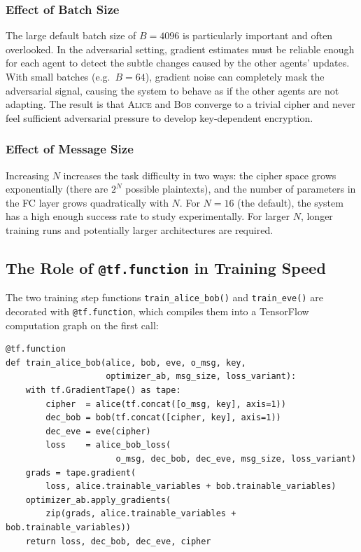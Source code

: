 \documentclass[12pt, a4paper]{article}
\newcommand{\alice}{\textsc{Alice}}
\newcommand{\bob}{\textsc{Bob}}
\newcommand{\code}[1]{\texttt{\color{CodeRed}#1}}
\begin{document}
\subsubsection*{Effect of Batch Size}

The large default batch size of $B=4096$ is particularly important
and often overlooked. In the adversarial setting, gradient estimates
must be reliable enough for each agent to detect the subtle changes
caused by the other agents' updates. With small batches (e.g.\ $B=64$),
gradient noise can completely mask the adversarial signal, causing the
system to behave as if the other agents are not adapting. The result
is that \alice{} and \bob{} converge to a trivial cipher and never
feel sufficient adversarial pressure to develop key-dependent encryption.

\subsubsection*{Effect of Message Size}

Increasing $N$ increases the task difficulty in two ways: the cipher
space grows exponentially (there are $2^N$ possible plaintexts), and
the number of parameters in the FC layer grows quadratically with $N$.
For $N=16$ (the default), the system has a high enough success rate
to study experimentally. For larger $N$, longer training runs and
potentially larger architectures are required.

\subsection{The Role of \texttt{@tf.function} in Training Speed}
\label{subsec:tf_function}

The two training step functions \code{train\_alice\_bob()} and
\code{train\_eve()} are decorated with \code{@tf.function}, which
compiles them into a TensorFlow computation graph on the first call:

\begin{lstlisting}[caption={\texttt{@tf.function} compilation of training steps}]
@tf.function
def train_alice_bob(alice, bob, eve, o_msg, key,
                    optimizer_ab, msg_size, loss_variant):
    with tf.GradientTape() as tape:
        cipher  = alice(tf.concat([o_msg, key], axis=1))
        dec_bob = bob(tf.concat([cipher, key], axis=1))
        dec_eve = eve(cipher)
        loss    = alice_bob_loss(
                      o_msg, dec_bob, dec_eve, msg_size, loss_variant)
    grads = tape.gradient(
        loss, alice.trainable_variables + bob.trainable_variables)
    optimizer_ab.apply_gradients(
        zip(grads, alice.trainable_variables + bob.trainable_variables))
    return loss, dec_bob, dec_eve, cipher
\end{lstlisting}
\end{document}
